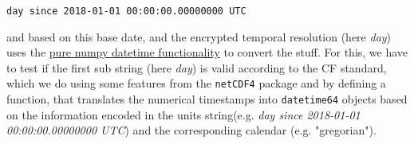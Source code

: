\documentclass[11pt]{article}
\begin{document}
    \begin{Verbatim}[commandchars=\\\{\}]
day since 2018-01-01 00:00:00.00000000 UTC

    \end{Verbatim}

    and based on this base date, and the encrypted temporal resolution (here
\emph{day}) uses the
\href{https://docs.scipy.org/doc/numpy-1.14.0/reference/arrays.datetime.html}{pure
numpy datetime functionality} to convert the stuff. For this, we have to
test if the first sub string (here \emph{day}) is valid according to the
CF standard, which we do using some features from the \texttt{netCDF4}
package and by defining a function, that translates the numerical
timestamps into \texttt{datetime64} objects based on the information
encoded in the units string(e.g. \emph{day since 2018-01-01
00:00:00.00000000 UTC}) and the corresponding calendar (e.g.
"gregorian").
\end{document}
